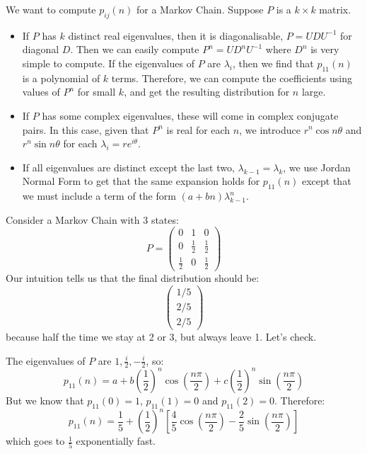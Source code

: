 \documentclass[../Main.tex]{subfiles}
\begin{document}
We want to compute $p_{ij}(n)$ for a Markov Chain. Suppose $P$ is a $k \times k$ matrix.
\begin{itemize}
    \item If $P$ has $k$ distinct real eigenvalues, then it is diagonalisable, $P = UDU^{-1}$ for diagonal $D$. Then we can easily compute $P^n = UD^n U^{-1}$ where $D^n$ is very simple to compute. If the eigenvalues of $P$ are $\lambda_i$, then we find that $p_{11}(n)$ is a polynomial of $k$ terms. Therefore, we can compute the coefficients using values of $P^n$ for small $k$, and get the resulting distribution for $n$ large.
    \item If $P$ has some complex eigenvalues, these will come in complex conjugate pairs. In this case, given that $P^n$ is real for each $n$, we introduce $r^n\cos{n\theta}$ and $r^n\sin{n\theta}$ for each $\lambda_i = re^{i\theta}$.
    \item If all eigenvalues are distinct except the last two, $\lambda_{k - 1} = \lambda_k$, we use Jordan Normal Form to get that the same expansion holds for $p_{11}(n)$ except that we must include a term of the form $(a + bn) \lambda_{k-1}^n$.
\end{itemize}
\begin{example}
    Consider a Markov Chain with 3 states:
    \begin{equation*}
        P=
        \begin{pmatrix}
            0 & 1 & 0 \\
            0 & \frac12 & \frac12 \\
            \frac12 & 0 & \frac12
        \end{pmatrix}
    \end{equation*}
    Our intuition tells us that the final distribution should be:
    \begin{equation*}
        \begin{pmatrix}1/5 \\ 2/5 \\ 2/5\end{pmatrix}
    \end{equation*}
    because half the time we stay at 2 or 3, but always leave 1. Let's check.

    The eigenvalues of $P$ are $1, \frac{i}{2}, -\frac{i}{2}$, so:
    \begin{equation*}
        p_{11}(n) = a + b\left(\frac12\right)^n \cos\left(\frac{n\pi}{2}\right) + c\left(\frac{1}{2}\right)^n \sin\left(\frac{n\pi}{2}\right)
    \end{equation*}
    But we know that $p_{11}(0) = 1$, $p_{11}(1) = 0$ and $p_{11}(2) = 0$. Therefore:
    \begin{equation*}
        p_{11}(n) = \frac15 + \left(\frac12\right)^n \left[\frac45 \cos\left(\frac{n\pi}{2}\right) - \frac25 \sin\left(\frac{n\pi}{2}\right)\right]
    \end{equation*}
    which goes to $\frac15$ exponentially fast.
\end{example}
\end{document}
